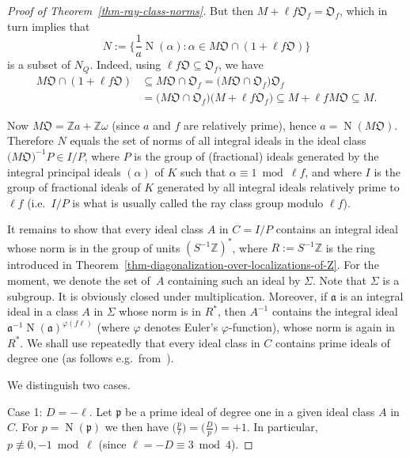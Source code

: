 \documentclass[12pt, a4paper, draft]{article}
\theoremstyle{plain}
\newtheorem*{Main Theorem}{Main Theorem}
\begin{document}
{{\begin{proof}[Proof of Theorem~\ref{thm-ray-class-norms}]
  But then $M+\ell f {\mathfrak O}_f = {\mathfrak O}_f$, which in turn
  implies that
  \[
  N:=\{\frac 1a {{\operatorname{{N}}}(\alpha)}: \alpha \in M{\mathfrak
    O}\cap(1+\ell f \mathfrak O)\}
  \]
  is a subset of $N_Q$.  Indeed, using $\ell f \mathfrak O \subseteq
  {\mathfrak O}_f$, we have
  \begin{align*}
    M{\mathfrak O}\cap(1+\ell f \mathfrak O) &\subseteq M{\mathfrak
      O}\cap{\mathfrak O}_f
    =\big(M{\mathfrak O}\cap{\mathfrak O}_f\big){\mathfrak O}_f\\
    &= \big(M{\mathfrak O}\cap{\mathfrak O}_f\big)\big(M+\ell f
    {\mathfrak O}_f\big) \subseteq M+\ell f M{\mathfrak O}\subseteq M
    .
  \end{align*}
  
  Now $M{\mathfrak O}={{\mathbb Z}} a + {{\mathbb Z}}\omega$ (since $a$ and $f$ are
  relatively prime), hence $a = {\operatorname{{N}}}(M{\mathfrak O})$.  Therefore
  $N$ equals the set of norms of all integral ideals in the ideal
  class $\big({M{\mathfrak O}}\big)^{-1} P\in I/P$, where $P$ is the
  group of (fractional) ideals generated by the integral principal
  ideals $(\alpha)$ of $K$ such that $\alpha \equiv 1 \bmod \ell f$,
  and where $I$ is the group of fractional ideals of $K$ generated by
  all integral ideals relatively prime to~$\ell f$ (i.e.~$I/P$ is what
  is usually called the ray class group modulo $\ell f$).

  It remains to show that every ideal class $A$ in $C=I/P$ contains an
  integral ideal whose norm is in the group of units $(S^{-1}{{\mathbb Z}})^*$,
  where $R:=S^{-1}{{\mathbb Z}}$ is the ring introduced in
  Theorem~\ref{thm-diagonalization-over-localizations-of-Z}. For the
  moment, we denote the set of~$A$ containing such an ideal by
  $\Sigma$.  Note that $\Sigma$ is a subgroup. It is obviously closed
  under multiplication. Moreover, if ${\mathfrak a}$ is an integral
  ideal in a class $A$ in $\Sigma$ whose norm is in $R^*$, then
  $A^{-1}$ contains the integral ideal ${\mathfrak
    a}^{-1}{\operatorname{{N}}}({\mathfrak a})^{\varphi(f\ell)}$ (where $\varphi$
  denotes Euler's $\varphi$-function), whose norm is again in $R^*$.
  We shall use repeatedly that every ideal class in $C$ contains prime
  ideals of degree one (as follows e.g.~from~\cite[p.~318]{Hecke}).

  We distinguish two cases.

  Case 1: $D=-\ell$. Let ${\mathfrak p}$ be a prime ideal of degree
  one in a given ideal class $A$ in $C$. For $p={\operatorname{{N}}}({\mathfrak
    p})$ we then have ${\big(\frac{p}{\ell}\big)} = {\big(\frac{D}{p}\big)} = +1$. In
  particular, $p \not\equiv 0,-1 \bmod \ell$ (since $\ell =-D \equiv 3
  \bmod 4$).


\end{proof}}}
\end{document}
